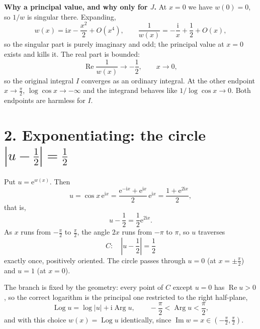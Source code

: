 \documentclass[12pt]{article}
\newcommand{\ii}{\mathrm{i}}
\newcommand{\e}{\mathrm{e}}
\newcommand{\Log}{\operatorname{Log}}
\newcommand{\Arg}{\operatorname{Arg}}
\newcommand{\Rp}{\operatorname{Re}}
\newcommand{\Ip}{\operatorname{Im}}
\begin{document}
\textbf{Why a principal value, and why only for \(J\).}
At \(x=0\) we have \(w(0)=0\), so \(1/w\) is singular there. Expanding,
\[
w(x)=\ii x-\frac{x^2}{2}+O(x^4),
\qquad
\frac1{w(x)}=-\frac{\ii}{x}+\frac12+O(x),
\]
so the singular part is purely imaginary and odd; the principal value at
\(x=0\) exists and kills it. The real part is bounded:
\[
\Rp\frac1{w(x)}\longrightarrow-\frac12,\qquad x\to0,
\]
so the original integral \(I\) converges as an ordinary integral. At the
other endpoint \(x\to\frac\pi2\), \(\log\cos x\to-\infty\) and the
integrand behaves like \(1/\log\cos x\to0\). Both endpoints are harmless
for \(I\).

\section*{2. Exponentiating: the circle \(|u-\frac12|=\frac12\)}

Put \(u=\e^{w(x)}\). Then
\[
u=\cos x\,\e^{\ii x}
=\frac{\e^{-\ii x}+\e^{\ii x}}{2}\,\e^{\ii x}
=\frac{1+\e^{2\ii x}}{2},
\]
that is,
\[
\boxed{\displaystyle u-\frac12=\frac12\e^{2\ii x}.}
\tag{3}
\]
As \(x\) runs from \(-\frac\pi2\) to \(\frac\pi2\), the angle \(2x\) runs
from \(-\pi\) to \(\pi\), so \(u\) traverses
\[
C:\quad\left|u-\frac12\right|=\frac12
\]
exactly once, positively oriented. The circle passes through \(u=0\) (at
\(x=\pm\frac\pi2\)) and \(u=1\) (at \(x=0\)).

\begin{center}
\end{center}

The branch is fixed by the geometry: every point of \(C\) except \(u=0\)
has \(\Rp u>0\), so the correct logarithm is the principal one restricted
to the right half-plane,
\[
\Log u=\log|u|+\ii\Arg u,\qquad -\frac\pi2<\Arg u<\frac\pi2,
\]
and with this choice \(w(x)=\Log u\) identically, since
\(\Ip w=x\in(-\frac\pi2,\frac\pi2)\).
\end{document}
